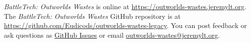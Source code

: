 \emph{BattleTech: Outworlds Wastes} is online at \href{https://outworlds-wastes.jeremylt.org}{https://outworlds-wastes.jeremylt.org}.
The \emph{BattleTech: Outworlds Wastes} GitHub repository is at \href{https://github.com/Eudicods/outworlds-wastes-legacy}{https://github.com/Eudicods/outworlds-wastes-legacy}.
You can post feedback or ask questions as \href{https://github.com/Eudicods/outworlds-wastes-legacy/issues}{GitHub Issues} or email \href{mailto:outworlds-wastes@jeremylt.org}{outworlds-wastes@jeremylt.org}.
